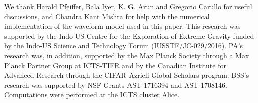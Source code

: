 \documentclass[prd,preprintnumbers,twocolumn,eqsecnum,floatfix,a4paper,nofootinbib,superscriptaddress]{revtex4}
\begin{document}
\bigskip 
\acknowledgments
We thank Harald Pfeiffer, Bala Iyer, K. G. Arun and Gregorio Carullo for useful discussions, and Chandra Kant Mishra for help with the numerical implementation of the waveform model used in this paper. This research was supported by the Indo-US Centre for the Exploration of Extreme Gravity funded by the Indo-US Science and Technology Forum (IUSSTF/JC-029/2016). PA's research was, in addition, supported by the Max Planck Society through a Max Planck Partner Group at ICTS-TIFR and by the Canadian Institute for Advanced Research through the CIFAR Azrieli Global Scholars program. BSS's research was supported by NSF Grants AST-1716394 and AST-1708146. Computations were performed at the ICTS cluster Alice. 


\end{document}
